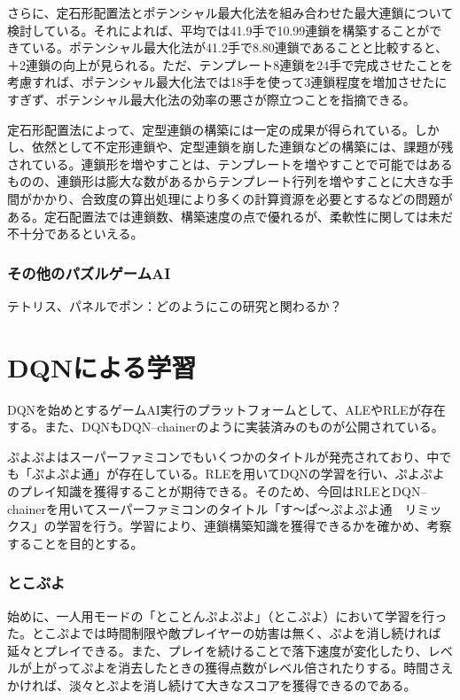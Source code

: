 \documentclass[12pt]{jsarticle}
\begin{document}
さらに、定石形配置法とポテンシャル最大化法を組み合わせた最大連鎖について検討している。それによれば、平均では41.9手で10.99連鎖を構築することができている。ポテンシャル最大化法が41.2手で8.80連鎖であることと比較すると、＋2連鎖の向上が見られる。ただ、テンプレート8連鎖を24手で完成させたことを考慮すれば、ポテンシャル最大化法では18手を使って3連鎖程度を増加させたにすぎず、ポテンシャル最大化法の効率の悪さが際立つことを指摘できる。

定石形配置法によって、定型連鎖の構築には一定の成果が得られている。しかし、依然として不定形連鎖や、定型連鎖を崩した連鎖などの構築には、課題が残されている。連鎖形を増やすことは、テンプレートを増やすことで可能ではあるものの、連鎖形は膨大な数があるからテンプレート行列を増やすことに大きな手間がかかり、合致度の算出処理により多くの計算資源を必要とするなどの問題がある。定石配置法では連鎖数、構築速度の点で優れるが、柔軟性に関しては未だ不十分であるといえる。

\section{その他のパズルゲームAI}
テトリス、パネルでポン：どのようにこの研究と関わるか？

\part{DQNによる学習} \setcounter{section}{0}
DQNを始めとするゲームAI実行のプラットフォームとして、ALE\cite{ALE}やRLE\cite{RLE}が存在する。また、DQNもDQN--chainer\cite{DQN_chainer}のように実装済みのものが公開されている。

ぷよぷよはスーパーファミコンでもいくつかのタイトルが発売されており、中でも「ぷよぷよ通」が存在している。RLEを用いてDQNの学習を行い、ぷよぷよのプレイ知識を獲得することが期待できる。そのため、今回はRLEとDQN--chainerを用いてスーパーファミコンのタイトル「す～ぱ～ぷよぷよ通　リミックス」の学習を行う。学習により、連鎖構築知識を獲得できるかを確かめ、考察することを目的とする。


\section{とこぷよ}
始めに、一人用モードの「とことんぷよぷよ」（とこぷよ）において学習を行った。とこぷよでは時間制限や敵プレイヤーの妨害は無く、ぷよを消し続ければ延々とプレイできる。また、プレイを続けることで落下速度が変化したり、レベルが上がってぷよを消去したときの獲得点数がレベル倍されたりする。時間さえかければ、淡々とぷよを消し続けて大きなスコアを獲得できるのである。
\end{document}
